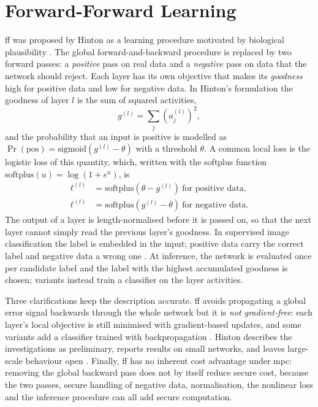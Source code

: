 \section{Forward-Forward Learning}\label{sec:bg-ff}
\ac{ff} was proposed by Hinton as a learning procedure motivated by biological plausibility \cite{hinton2022ff}. The global forward-and-backward procedure is replaced by two forward passes: a \emph{positive} pass on real data and a \emph{negative} pass on data that the network should reject. Each layer has its own objective that makes its \emph{goodness} high for positive data and low for negative data. In Hinton's formulation the goodness of layer $l$ is the sum of squared activities,
\begin{equation}
  g^{(l)} = \sum_{j} \left(a^{(l)}_j\right)^2 ,
  \label{eq:goodness}
\end{equation}
and the probability that an input is positive is modelled as $\Pr(\text{pos}) = \mathrm{sigmoid}\!\left(g^{(l)}-\theta\right)$ with a threshold $\theta$. A common local loss is the logistic loss of this quantity, which, written with the softplus function $\mathrm{softplus}(u)=\log(1+e^{u})$, is
\begin{align}
  \ell^{(l)} &= \mathrm{softplus}\!\left(\theta - g^{(l)}\right)\ \text{for positive data}, \label{eq:ff-loss-pos}\\
  \ell^{(l)} &= \mathrm{softplus}\!\left(g^{(l)} - \theta\right)\ \text{for negative data}. \label{eq:ff-loss-neg}
\end{align}
The output of a layer is length-normalised before it is passed on, so that the next layer cannot simply read the previous layer's goodness. In supervised image classification the label is embedded in the input; positive data carry the correct label and negative data a wrong one \cite{hinton2022ff}. At inference, the network is evaluated once per candidate label and the label with the highest accumulated goodness is chosen; variants instead train a classifier on the layer activities.

Three clarifications keep the description accurate. \ac{ff} avoids propagating a global error signal backwards through the whole network but it is \emph{not gradient-free}: each layer's local objective is still minimised with gradient-based updates, and some variants add a classifier trained with backpropagation \cite{aktemur2025pff,chen2025scff}. Hinton describes the investigations as preliminary, reports results on small networks, and leaves large-scale behaviour open \cite{hinton2022ff}. Finally, \ac{ff} has no inherent cost advantage under \ac{mpc}: removing the global backward pass does not by itself reduce secure cost, because the two passes, secure handling of negative data, normalisation, the nonlinear loss and the inference procedure can all add secure computation.

